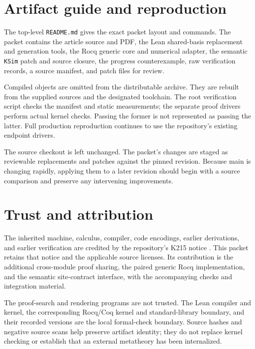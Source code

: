 \documentclass[11pt,letterpaper]{article}
\begin{document}
\appendix
\section{Artifact guide and reproduction}

The top-level \texttt{README.md} gives the exact packet layout and commands.
The packet contains the article source and PDF, the Lean shared-basis
replacement and generation tools, the Rocq generic core and numerical adapter,
the semantic \texttt{KSim} patch and source closure, the progress counterexample,
raw verification records, a source manifest, and patch files for review.

Compiled objects are omitted from the distributable archive. They are rebuilt
from the supplied sources and the designated toolchain. The root verification
script checks the manifest and static measurements; the separate proof drivers
perform actual kernel checks. Passing the former is not represented as passing
the latter. Full production reproduction continues to use the repository's
existing endpoint drivers.

The source checkout is left unchanged. The packet's changes are staged as
reviewable replacements and patches against the pinned revision. Because main
is changing rapidly, applying them to a later revision should begin with a
source comparison and preserve any intervening improvements.

\section{Trust and attribution}

The inherited machine, calculus, compiler, code encodings, earlier derivations,
and earlier verification are credited by the repository's K215 notice
\cite{notice}. This packet retains that notice and the applicable source
licenses. Its contribution is the additional cross-module proof sharing, the
paired generic Rocq implementation, and the semantic site-contract interface,
with the accompanying checks and integration material.

The proof-search and rendering programs are not trusted. The Lean compiler and
kernel, the corresponding Rocq/Coq kernel and standard-library boundary, and
their recorded versions are the local formal-check boundary. Source hashes and
negative source scans help preserve artifact identity; they do not replace
kernel checking or establish that an external metatheory has been internalized.
\end{document}
